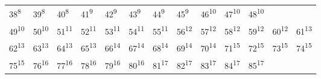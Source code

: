 \documentclass[a4paper,twoside]{article}
\begin{document}
\begin{Row}
\begin{Cell}{2}
\begin{tabular}{ | m{2.5mm} m{2.5mm} m{2.5mm} m{2.5mm} m{2.5mm} m{2.5mm} m{2.5mm} m{2.5mm} m{2.5mm} m{2.5mm} m{2.5mm} m{2.5mm} m{4mm} | }
            \footnotesize{38\textsuperscript{8}} &
            \footnotesize{39\textsuperscript{8}} &
            \footnotesize{40\textsuperscript{8}} &
            \footnotesize{41\textsuperscript{9}} &
            \footnotesize{42\textsuperscript{9}} &
            \footnotesize{43\textsuperscript{9}} &
            \footnotesize{44\textsuperscript{9}} &
            \footnotesize{45\textsuperscript{9}} &
            \footnotesize{46\textsuperscript{10}} &
            \footnotesize{47\textsuperscript{10}} &
            \footnotesize{48\textsuperscript{10}} \\
            \footnotesize{49\textsuperscript{10}} &
            \footnotesize{50\textsuperscript{10}} &
            \footnotesize{51\textsuperscript{11}} &
            \footnotesize{52\textsuperscript{11}} &
            \footnotesize{53\textsuperscript{11}} &
            \footnotesize{54\textsuperscript{11}} &
            \footnotesize{55\textsuperscript{11}} &
            \footnotesize{56\textsuperscript{12}} &
            \footnotesize{57\textsuperscript{12}} &
            \footnotesize{58\textsuperscript{12}} &
            \footnotesize{59\textsuperscript{12}} &
            \footnotesize{60\textsuperscript{12}} &
            \footnotesize{61\textsuperscript{13}} \\
            \footnotesize{62\textsuperscript{13}} &
            \footnotesize{63\textsuperscript{13}} &
            \footnotesize{64\textsuperscript{13}} &
            \footnotesize{65\textsuperscript{13}} &
            \footnotesize{66\textsuperscript{14}} &
            \footnotesize{67\textsuperscript{14}} &
            \footnotesize{68\textsuperscript{14}} &
            \footnotesize{69\textsuperscript{14}} &
            \footnotesize{70\textsuperscript{14}} &
            \footnotesize{71\textsuperscript{15}} &
            \footnotesize{72\textsuperscript{15}} &
            \footnotesize{73\textsuperscript{15}} &
            \footnotesize{74\textsuperscript{15}} \\
            \footnotesize{75\textsuperscript{15}} &
            \footnotesize{76\textsuperscript{16}} &
            \footnotesize{77\textsuperscript{16}} &
            \footnotesize{78\textsuperscript{16}} &
            \footnotesize{79\textsuperscript{16}} &
            \footnotesize{80\textsuperscript{16}} &
            \footnotesize{81\textsuperscript{17}} &
            \footnotesize{82\textsuperscript{17}} &
            \footnotesize{83\textsuperscript{17}} &
            \footnotesize{84\textsuperscript{17}} &
            \footnotesize{85\textsuperscript{17}} &

\end{tabular}
\end{Cell}
\end{Row}
\end{document}
